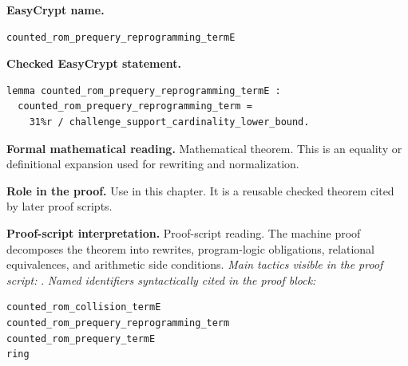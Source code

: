 \begin{formaltheorem}
\noindent\textbf{EasyCrypt name.}
\begin{lstlisting}[language=EasyCrypt,basicstyle=\ttfamily\scriptsize]
counted_rom_prequery_reprogramming_termE
\end{lstlisting}
\noindent\textbf{Checked EasyCrypt statement.}
\begin{lstlisting}[language=EasyCrypt,basicstyle=\ttfamily\scriptsize]
lemma counted_rom_prequery_reprogramming_termE :
  counted_rom_prequery_reprogramming_term =
    31%r / challenge_support_cardinality_lower_bound.
\end{lstlisting}
\noindent\textbf{Formal mathematical reading.}
Mathematical theorem. This is an equality or definitional expansion used for rewriting and normalization.

\noindent\textbf{Role in the proof.}
Use in this chapter. It is a reusable checked theorem cited by later proof scripts.

\noindent\textbf{Proof-script interpretation.}
Proof-script reading. The machine proof decomposes the theorem into rewrites, program-logic obligations, relational equivalences, and arithmetic side conditions.
\emph{Main tactics visible in the proof script:} .
\emph{Named identifiers syntactically cited in the proof block:}
\begin{lstlisting}[language=EasyCrypt,basicstyle=\ttfamily\scriptsize]
counted_rom_collision_termE
counted_rom_prequery_reprogramming_term
counted_rom_prequery_termE
ring
\end{lstlisting}

\end{formaltheorem}

